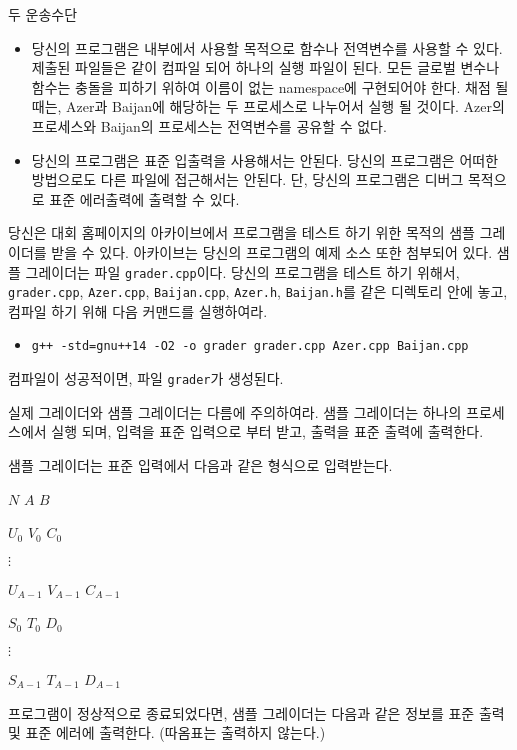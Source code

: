 \begin{problem}{두 운송수단}
	\Notes
	
	\begin{itemize}
		\item 당신의 프로그램은 내부에서 사용할 목적으로 함수나 전역변수를 사용할 수 있다. 제출된 파일들은 같이 컴파일 되어 하나의 실행 파일이 된다. 모든 글로벌 변수나 함수는 충돌을 피하기 위하여 이름이 없는 namespace에 구현되어야 한다. 채점 될 때는, Azer과 Baijan에 해당하는 두 프로세스로 나누어서 실행 될 것이다. Azer의 프로세스와 Baijan의 프로세스는 전역변수를 공유할 수 없다.
		\item 당신의 프로그램은 표준 입출력을 사용해서는 안된다. 당신의 프로그램은 어떠한 방법으로도 다른 파일에 접근해서는 안된다. 단, 당신의 프로그램은 디버그 목적으로 표준 에러출력에 출력할 수 있다.
	\end{itemize}
	
	당신은 대회 홈페이지의 아카이브에서 프로그램을 테스트 하기 위한 목적의 샘플 그레이더를 받을 수 있다. 아카이브는 당신의 프로그램의 예제 소스 또한 첨부되어 있다.
	샘플 그레이더는 파일 \texttt{grader.cpp}이다. 당신의 프로그램을 테스트 하기 위해서, \texttt{grader.cpp}, \texttt{Azer.cpp}, \texttt{Baijan.cpp}, \texttt{Azer.h}, \texttt{Baijan.h}를 같은 디렉토리 안에 놓고, 컴파일 하기 위해 다음 커맨드를 실행하여라.
	
	\begin{itemize}
		\item \texttt{g++ -std=gnu++14 -O2 -o grader grader.cpp Azer.cpp Baijan.cpp}
	\end{itemize}
	
	컴파일이 성공적이면, 파일 \texttt{grader}가 생성된다.
	
	실제 그레이더와 샘플 그레이더는 다름에 주의하여라. 샘플 그레이더는 하나의 프로세스에서 실행 되며, 입력을 표준 입력으로 부터 받고, 출력을 표준 출력에 출력한다.
	
	\InputFile
	
	샘플 그레이더는 표준 입력에서 다음과 같은 형식으로 입력받는다.
	
	$N$ $A$ $B$
	
	$U_0$ $V_0$ $C_0$
	
	$\vdots$
	
	$U_{A-1}$ $V_{A-1}$ $C_{A-1}$

	$S_0$ $T_0$ $D_0$

	$\vdots$
	
	$S_{A-1}$ $T_{A-1}$ $D_{A-1}$	
	
	\OutputFile
	
	프로그램이 정상적으로 종료되었다면, 샘플 그레이더는 다음과 같은 정보를 표준 출력 및 표준 에러에 출력한다. (따옴표는 출력하지 않는다.)
	

\end{problem}

